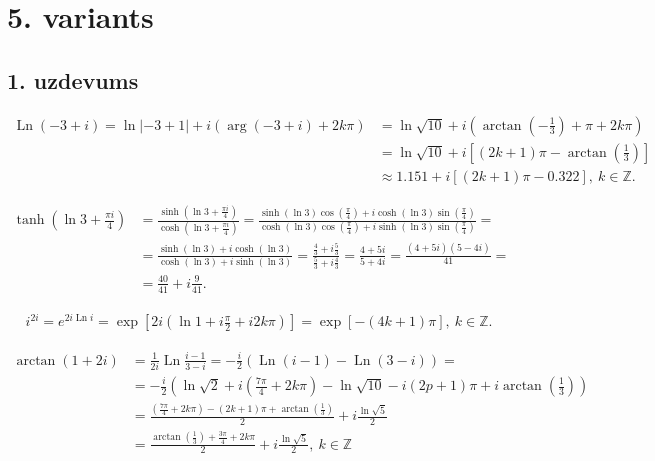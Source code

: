 \documentclass[a4paper,12pt]{article}
\DeclareMathOperator{\Ln}{Ln}
\begin{document}
\section*{5. variants}

\subsection*{1. uzdevums}

\begin{align*}
  \Ln{(-3 +i)} = \ln{|-3 + 1|} + i(\arg{(-3 + i)} + 2k\pi) &= \ln{\sqrt{10}} + i\left(\arctan{\left(-\frac{1}{3} \right)}+\pi  + 2k\pi \right)\\
  &= \ln{\sqrt{10}} + i\left[(2k+1)\pi - \arctan{\left(\frac{1}{3}\right)}\right]\\
  &\approx 1.151 + i\left[(2k+1)\pi - 0.322\right], ~  k \in \mathbb{Z}.
\end{align*}

\begin{align*}
  \tanh{\left( \ln{3} + \frac{\pi i}{4}\right)} &= \frac{\sinh{\left( \ln{3} + \frac{\pi i}{4}\right)}}{\cosh{\left( \ln{3} + \frac{\pi i}{4}\right)}} =
  \frac{\sinh{(\ln{3})}\cos{\left(\frac{\pi}{4}\right)} + i\cosh{(\ln{3})}\sin{\left(\frac{\pi}{4}\right)}}{\cosh{(\ln{3})}\cos{\left(\frac{\pi}{4}\right)} + i\sinh{(\ln{3})}\sin{\left(\frac{\pi}{4}\right)}} = \\
 &= \frac{\sinh{(\ln{3})} + i\cosh{(\ln{3})}}{\cosh{(\ln{3})} + i\sinh{(\ln{3})}} = \frac{\frac{4}{3}+i\frac{5}{3}}{\frac{5}{3} + i\frac{4}{3}} = \frac{4 + 5i}{5+4i} = \frac{(4+5i)(5-4i)}{41} = \\
  &=\frac{40}{41} + i\frac{9}{41}.
\end{align*}

\begin{align*}
  i^{2i} = e^{2i \Ln i} = \exp{[2i(\ln 1 + i\frac{\pi}{2} + i2k\pi)]} = \exp{\left[-(4k+1)\pi \right]}, ~ k\in \mathbb{Z}.
\end{align*}

\begin{align*}
\arctan{(1 +2i)} &= \frac{1}{2i} \Ln{\frac{i-1}{3-i}} = -\frac{i}{2}\left(\Ln{(i-1)}-\Ln{(3-i)}\right) = \\
&= -\frac{i}{2}\left(\ln{\sqrt{2}} + i\left(\frac{7\pi}{4} + 2k\pi\right) - \ln{\sqrt{10}} - i(2p+1)\pi + i\arctan{\left(\frac{1}{3}\right)}\right) \\
&= \frac{\left(\frac{7\pi}{4} + 2k\pi\right) - (2k+1)\pi + \arctan{\left(\frac{1}{3}\right)}}{2} +
i\frac{\ln{\sqrt{5}}}{2} \\
&= \frac{\arctan{\left(\frac{1}{3}\right)} + \frac{3\pi}{4} + 2k\pi}{2} + i\frac{\ln{\sqrt{5}}}{2}, ~ k \in \mathbb{Z}
\end{align*}
\end{document}

